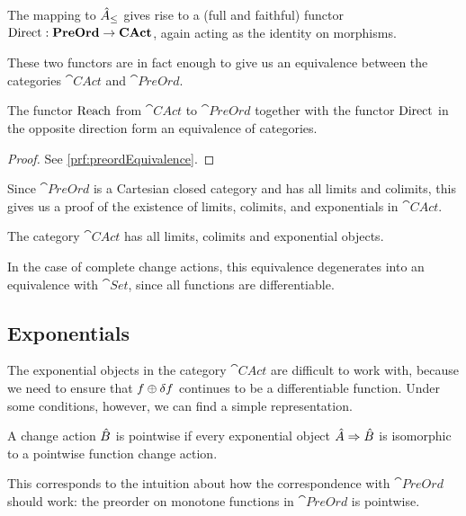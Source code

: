 The mapping to $\hat{A}_\leq$ gives rise to a (full and faithful) functor
$\operatorname{Direct} : \mathbf{PreOrd} \rightarrow \mathbf{CAct}$, again acting as the identity on morphisms.

These two functors are in fact enough to give us an equivalence between the categories
$\cat{CAct}$ and $\cat{PreOrd}$.

\begin{thm}[name=Equivalence of $\cat{CAct}$ and $\cat{PreOrd}$, restate=preordEquivalence]
  \label{thm:preordEquivalence}
  The functor $\operatorname{Reach}$ from $\cat{CAct}$ to $\cat{PreOrd}$ together with the
  functor $\operatorname{Direct}$ in the opposite direction form an equivalence of categories.
\end{thm}
\ifproofs
\begin{proof}
  See \cref{prf:preordEquivalence}.
\end{proof}
\fi

Since $\cat{PreOrd}$ is a Cartesian closed category and has all limits and
colimits, this gives us a proof of the existence of limits, colimits, and exponentials in $\cat{CAct}$.

\begin{corollary}
  The category $\cat{CAct}$ has all limits, colimits and exponential objects.
\end{corollary}

In the case of complete change actions, this equivalence degenerates into an
equivalence with $\cat{Set}$, since all functions are differentiable.

\subsection{Exponentials}
\label{sec:exponentials}

The exponential objects in the category $\cat{CAct}$ are difficult to work with,
because we need to ensure that $f \oplus \delta f$ continues to be a
differentiable function. Under some conditions, however, we can find a simple representation.

\begin{defn}
  \label{def:pointwiseChangeActions}
  A change action $\hat{B}$ is pointwise if every exponential object
  ${\hat{A}} \Rightarrow {\hat{B}}$ is isomorphic to a pointwise function change action.
\end{defn}

This corresponds to the intuition about how the correspondence with
$\cat{PreOrd}$ should work: the preorder on monotone functions in $\cat{PreOrd}$ is
pointwise.

